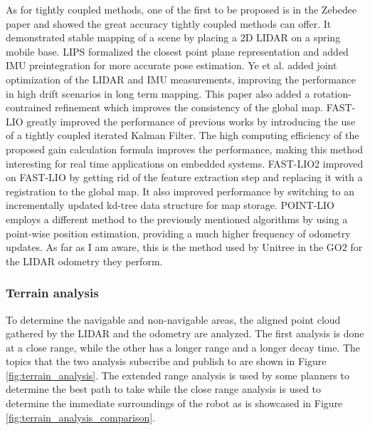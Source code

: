 \documentclass[12pt]{article}
\begin{document}
        As for tightly coupled methods, one of the first to be proposed is in the Zebedee paper \cite{bosse2012zebedee} and showed the great accuracy tightly coupled methods can offer. It demonstrated stable mapping of a scene by placing a 2D LIDAR on a spring mobile base. LIPS \cite{geneva2018lips} formalized the closest point plane representation and added IMU preintegration for more accurate pose estimation. Ye et al. \cite{ye2019tightly} added joint optimization of the LIDAR and IMU measurements, improving the performance in high drift scenarios in long term mapping. This paper also added a rotation-contrained refinement which improves the consistency of the global map.
        FAST-LIO \cite{xu2021fast} greatly improved the performance of previous works by introducing the use of a tightly coupled iterated Kalman Filter. The high computing efficiency of the proposed gain calculation formula improves the performance, making this method interesting for real time applications on embedded systems. FAST-LIO2 \cite{xu2022fast} improved on FAST-LIO by getting rid of the feature extraction step and replacing it with a registration to the global map. It also improved performance by switching to an incrementally updated kd-tree data structure for map storage. 
        POINT-LIO \cite{he2023point} employs a different method to the previously mentioned algorithms by using a point-wise position estimation, providing a much higher frequency of odometry updates. As far as I am aware, this is the method used by Unitree in the GO2 for the LIDAR odometry they perform.

        \label{section:etatArt}


        \subsubsection{Terrain analysis}
        \label{section:terrain_analysis}

        To determine the navigable and non-navigable areas, the aligned point cloud gathered by the LIDAR and the odometry are analyzed. The first analysis is done at a close range, while the other has a longer range and a longer decay time. The topics that the two analysis subscribe and publish to are shown in Figure \ref{fig:terrain_analysis}. The extended range analysis is used by some planners to determine the best path to take while the close range analysis is used to determine the immediate surroundings of the robot as is showcased in Figure \ref{fig:terrain_analysis_comparison}.
\end{document}
